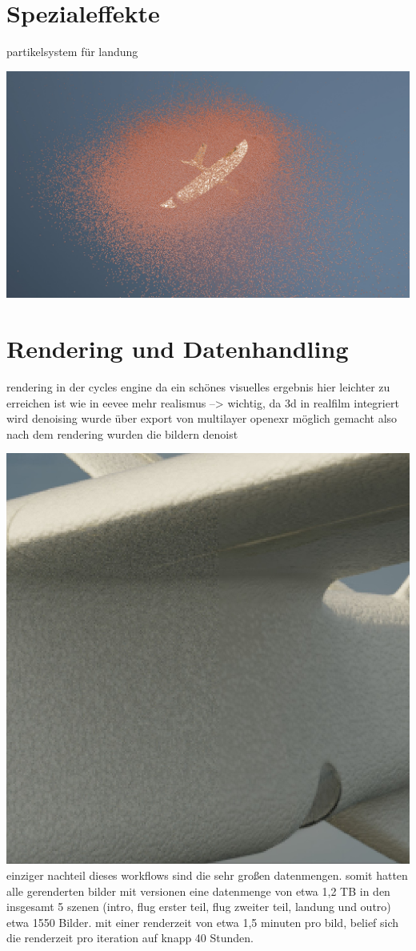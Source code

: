 \section{Spezialeffekte}

partikelsystem für landung

\includegraphics[width=\textwidth]{gfx/prod/plane/particles.jpg}

\section{Rendering und Datenhandling}

rendering in der cycles engine
da ein schönes visuelles ergebnis hier leichter zu erreichen ist wie in eevee
mehr realismus --> wichtig, da 3d in realfilm integriert wird
denoising wurde über export von multilayer openexr möglich gemacht
also nach dem rendering wurden die bildern denoist

\includegraphics[width=\textwidth]{gfx/post/denoising.jpg}
einziger nachteil dieses workflows sind die sehr großen datenmengen. somit hatten alle gerenderten bilder mit versionen eine datenmenge von etwa 1,2 TB
in den insgesamt 5 szenen (intro, flug erster teil, flug zweiter teil, landung und outro) etwa 1550 Bilder.
mit einer renderzeit von etwa 1,5 minuten pro bild, belief sich die renderzeit pro iteration auf knapp 40 Stunden.

